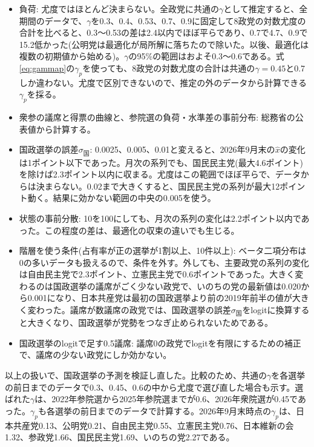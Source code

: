 \documentclass[a4paper,11pt]{ltjsarticle}
\begin{document}
\begin{itemize}
  \item 負荷: 尤度ではほとんど決まらない。全政党に共通の$\gamma$として推定すると、全期間のデータで、$\gamma$を0.3、0.4、0.53、0.7、0.9に固定して8政党の対数尤度の合計を比べると、0.3〜0.53の差は2.4以内でほぼ平らであり、0.7で4.7、0.9で15.2低かった(公明党は最適化が局所解に落ちたので除いた。以後、最適化は複数の初期値から始める)。$\gamma$の95\%の範囲はおよそ0.3〜0.6である。式\eqref{eq:gammap}の$\gamma_p$を使っても、8政党の対数尤度の合計は共通の$\gamma=0.45$と0.7しか違わない。尤度で区別できないので、推定の外のデータから計算できる$\gamma_p$を採る。
  \item 衆参の議席と得票の曲線と、参院選の負荷・水準差の事前分布: 総務省の公表値から計算する。
  \item 国政選挙の誤差$\sigma_{\text{国}}$: 0.0025、0.005、0.01と変えると、2026年9月末の$\hat x$の変化は1ポイント以下であった。月次の系列でも、国民民主党(最大4.6ポイント)を除けば2.3ポイント以内に収まる。尤度はこの範囲でほぼ平らで、データからは決まらない。0.02まで大きくすると、国民民主党の系列が最大12ポイント動く。結果に効かない範囲の中央の0.005を使う。
  \item 状態の事前分散: 10を100にしても、月次の系列の変化は2.2ポイント以内であった。この程度の差は、最適化の収束の違いでも生じる。
  \item 階層を使う条件(占有率が正の選挙が1割以上、10件以上): ベータ二項分布は0の多いデータも扱えるので、条件を外す。外しても、主要政党の系列の変化は自由民主党で2.3ポイント、立憲民主党で0.6ポイントであった。大きく変わるのは国政選挙の議席がごく少ない政党で、いのちの党の最新値は0.020から0.001になり、日本共産党は最初の国政選挙より前の2019年前半の値が大きく変わった。議席が数議席の政党では、国政選挙の誤差$\sigma_{\text{国}}$をlogitに換算すると大きくなり、国政選挙が党勢をつなぎ止められないためである。
  \item 国政選挙のlogitで足す0.5議席: 議席0の政党でlogitを有限にするための補正で、議席の少ない政党にしか効かない。
\end{itemize}

以上の扱いで、国政選挙の予測を検証し直した。比較のため、共通の$\gamma$を各選挙の前日までのデータで0.3、0.45、0.6の中から尤度で選び直した場合も示す。選ばれた$\gamma$は、2022年参院選から2025年参院選までが0.6、2026年衆院選が0.45であった。$\gamma_p$も各選挙の前日までのデータで計算する。2026年9月末時点の$\gamma_p$は、日本共産党0.13、公明党0.21、自由民主党0.55、立憲民主党0.76、日本維新の会1.32、参政党1.66、国民民主党1.69、いのちの党2.27である。
\end{document}

